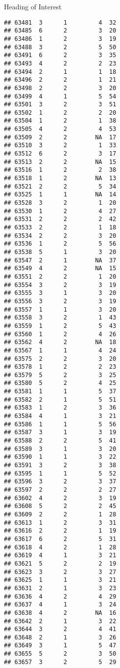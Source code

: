 \documentclass[
  ignorenonframetext,
]{beamer}
\begin{document}
\begin{frame}[fragile]{Heading of Interest}
\begin{verbatim}
## 63481  3      1         4  32
## 63485  6      2         3  20
## 63486  1      2         3  19
## 63488  3      2         5  50
## 63491  6      2         3  35
## 63493  4      2         2  23
## 63494  2      1         1  18
## 63496  2      2         1  21
## 63498  2      2         3  20
## 63499  4      1         5  54
## 63501  3      2         3  51
## 63502  1      2         2  20
## 63504  1      2         1  38
## 63505  4      2         4  53
## 63509  2      2        NA  17
## 63510  3      2         1  33
## 63512  6      2         3  17
## 63513  2      2        NA  15
## 63516  1      2         2  38
## 63518  1      2        NA  13
## 63521  2      2         5  34
## 63525  1      1        NA  14
## 63528  3      2         1  20
## 63530  1      2         4  27
## 63531  2      2         2  42
## 63533  2      2         1  18
## 63534  2      2         3  20
## 63536  1      2         5  56
## 63538  5      1         3  20
## 63547  2      1        NA  37
## 63549  4      2        NA  15
## 63551  2      2         1  20
## 63554  3      2         3  19
## 63555  3      1         3  20
## 63556  3      2         3  19
## 63557  1      1         3  20
## 63558  3      2         1  43
## 63559  1      2         5  43
## 63560  1      2         4  26
## 63562  4      2        NA  18
## 63567  1      1         4  24
## 63575  2      2         3  20
## 63578  1      2         2  23
## 63579  5      2         3  25
## 63580  5      2         4  25
## 63581  1      1         5  37
## 63582  2      1         5  51
## 63583  1      2         3  36
## 63584  4      1         3  21
## 63586  1      1         5  56
## 63587  3      1         3  19
## 63588  2      2         5  41
## 63589  3      1         3  20
## 63590  1      1         3  22
## 63591  3      2         3  38
## 63595  1      1         5  52
## 63596  3      2         3  37
## 63597  2      2         2  27
## 63602  4      2         3  19
## 63608  5      2         2  45
## 63609  2      2         1  28
## 63613  1      2         3  31
## 63616  2      2         1  19
## 63617  6      2         5  31
## 63618  4      2         1  28
## 63619  4      1         3  21
## 63621  5      2         2  19
## 63623  3      2         3  27
## 63625  1      1         3  21
## 63631  2      1         3  23
## 63636  4      2         4  29
## 63637  4      1         3  24
## 63638  4      2        NA  16
## 63642  2      1         3  22
## 63644  3      2         4  41
## 63648  2      1         3  26
## 63649  3      1         5  47
## 63655  5      2         3  50
## 63657  3      2         5  29

\end{verbatim}
\end{frame}
\end{document}
